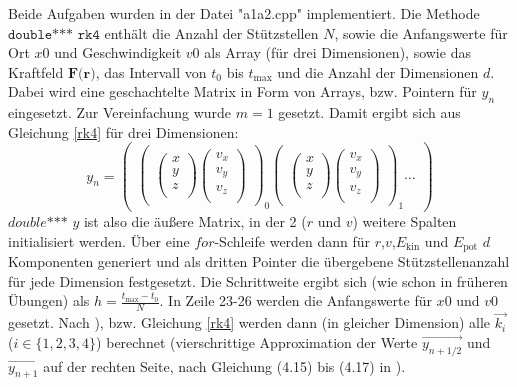Beide Aufgaben wurden in der Datei "a1a2.cpp" implementiert.  Die Methode $\texttt{double*** rk4}$ enthält die Anzahl der Stützstellen $N$, sowie die Anfangswerte für Ort $x0$ und Geschwindigkeit $v0$ als Array (für drei Dimensionen), sowie das Kraftfeld $\textbf{F(r)}$, das Intervall von $t_0$ bis $t_{\text{max}}$ und die Anzahl der Dimensionen $d$. Dabei wird eine geschachtelte Matrix in Form von Arrays, bzw. Pointern für $y_n$ eingesetzt. Zur Vereinfachung wurde $m = 1$ gesetzt. Damit ergibt sich aus Gleichung \eqref{rk4} für drei Dimensionen:
\begin{equation*}
	y_n = 
	\begin{pmatrix}
		\begin{pmatrix}
			\begin{pmatrix}
				x\\
				y\\
				z\\
			\end{pmatrix} 
			\begin{pmatrix}
				v_x\\
				v_y\\
				v_z\\
			\end{pmatrix}
		\end{pmatrix}_0
		\begin{pmatrix}
			\begin{pmatrix}
				x\\
				y\\
				z\\
			\end{pmatrix} 
			\begin{pmatrix}
				v_x\\
				v_y\\
				v_z\\
			\end{pmatrix}
		\end{pmatrix}_1
		\ldots
	\end{pmatrix}
\end{equation*}
$\textit{double*** y}$ ist also die äußere Matrix, in der 2 ($r$ und $v$) weitere Spalten initialisiert werden. Über eine $\textit{for}$-Schleife werden dann für $r$,$v$,$E_{\text{kin}}$ und $E_{\text{pot}}$ $d$ Komponenten generiert und als dritten Pointer die übergebene Stützstellenanzahl für jede Dimension festgesetzt.
Die Schrittweite ergibt sich (wie schon in früheren Übungen) als $h = \frac{t_{\text{max}}-t_0}{N}$. In Zeile 23-26 werden die Anfangswerte für $x0$ und $v0$ gesetzt.
Nach \cite[52]{script}), bzw. Gleichung \eqref{rk4} werden dann (in gleicher Dimension) alle $\vec{k_i}$ ($i \in \{1,2,3,4\}$) berechnet (vierschrittige Approximation der Werte $\vec{y_{n+1/2}}$ und $\vec{y_{n+1}}$ auf der rechten Seite, nach Gleichung (4.15) bis (4.17) in \cite[52]{script}).

